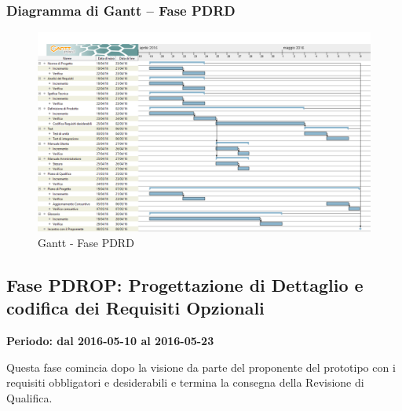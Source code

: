 \documentclass[../PianoProgetto.tex]{subfiles}
\begin{document}
		\subsubsection{Diagramma di Gantt – Fase PDRD}
			\begin{figure}[!h]
				\centering
				\includegraphics[width=\textwidth]{gantt_png/5-requisiti_desiderabili}
				\caption{Gantt - Fase PDRD}
				\label{fig:Gantt - Fase PDRD}
			\end{figure}
			
		
	\subsection{Fase PDROP: Progettazione di Dettaglio e codifica dei Requisiti Opzionali}
		\textbf{Periodo: dal 2016-05-10 al 2016-05-23}
		
		Questa fase comincia dopo la visione da parte del proponente del prototipo con i requisiti obbligatori e desiderabili e termina la consegna della Revisione di Qualifica.
\end{document}
